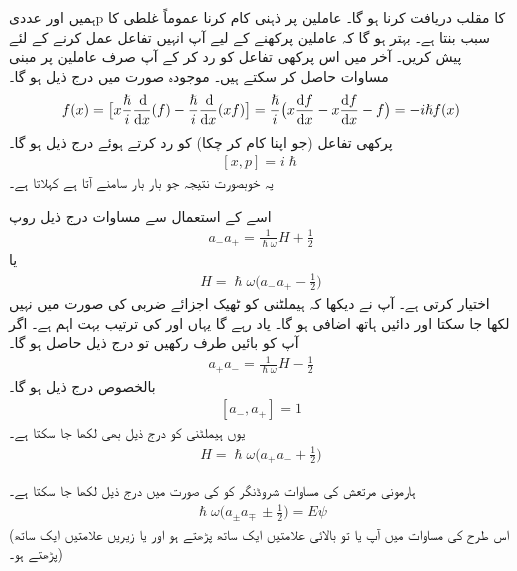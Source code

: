 ہمیں  اور عددی{p} کا مقلب دریافت کرنا ہو گا۔  عاملین پر ذہنی کام کرنا عموماً غلطی کا سبب بنتا ہے۔ بہتر ہو گا کہ عاملین پرکھنے کے لیے آپ انہیں تفاعل  عمل کرنے کے لئے پیش کریں۔ آخر میں اس پرکھی تفاعل کو رد کر کے آپ صرف عاملین پر مبنی مساوات حاصل کر سکتے ہیں۔ موجودہ صورت میں درج ذیل ہو گا۔
\begin{align}
[x,p]f(x)=\big[x\frac{\hslash}{i}\frac{\dif}{\dif{x}}(f)-\frac{\hslash}{i}\frac{\dif}{\dif{x}}(xf)\big ]=\frac{\hslash}{i}\big (x\frac{\dif{f}}{\dif{x}}-x\frac{\dif{f}}{\dif{x}}-f\big )=-i\hslash f(x)
\end{align}
پرکھی تفاعل (جو اپنا کام کر چکا) کو رد کرتے ہوئے درج ذیل ہو گا۔
\begin{align}\label{مساوات_غیر_تابع_شروڈنگر_مقام_معیار_حرکت_تبادل_کار}
[x,p]=i\hslash
\end{align}
یہ خوبصورت نتیجہ جو بار بار سامنے آتا ہے  کہلاتا ہے۔

اسے کے استعمال سے مساوات  درج ذیل روپ 
\begin{align}
a_{-}a_{+}=\frac{1}{\hslash\omega}H+\frac{1}{2}
\end{align}
یا
\begin{align}
H=\hslash\omega\big (a_{-}a_{+}-\frac{1}{2} \big )
\end{align}
اختیار کرتی ہے۔ آپ نے دیکھا کہ ہیملٹنی کو ٹھیک اجزائے ضربی کی صورت میں نہیں لکھا جا سکتا اور دائیں ہاتھ اضافی  ہو گا۔ یاد رہے گا یہاں  اور  کی ترتیب بہت اہم ہے۔ اگر آپ  کو بائیں طرف رکھیں تو درج ذیل حاصل ہو گا۔
\begin{align}
a_{+}a_{-}=\frac{1}{\hslash\omega}H-\frac{1}{2}
\end{align}
بالخصوص درج ذیل ہو گا۔
\begin{align}\label{مساوات_شروڈنگر_سیڑھی_ضرب_برابر_اکائی}
[a_{-},a_{+}]=1
\end{align}
یوں ہیملٹنی کو درج ذیل بھی لکھا جا سکتا ہے۔
\begin{align}
H=\hslash\omega\big (a_{+}a_{-}+\frac{1}{2}\big )
\end{align}


ہارمونی مرتعش کی مساوات شروڈنگر کو  کی صورت میں درج ذیل لکھا جا سکتا ہے۔
\begin{align}\label{مساوات_شروڈنگر_عوامل_روپ}
 \hslash \omega \big(a_{\pm} a_{\mp} \,\pm \frac{1}{2}\big)=E\psi 		
\end{align}
(اس طرح کی مساوات میں آپ یا تو بالائی علامتیں ایک ساتھ پڑھتے ہو اور یا زیریں علامتیں ایک ساتھ پڑھتے ہو۔)


